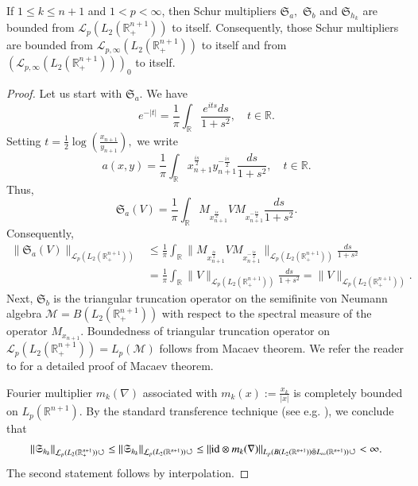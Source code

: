 \documentclass[12pt]{amsart}
\begin{document}
\begin{proposition}\label{standard schur lemma}
If $1\leq k\leq n+1$ and $1<p<\infty$, then Schur multipliers $\mathfrak{S}_a,$ $\mathfrak{S}_b$ and $\mathfrak{S}_{h_k}$ are bounded from $\mathcal{L}_p(L_2(\mathbb{R}^{n+1}_+))$ to itself. Consequently, those Schur multipliers are bounded from $\mathcal{L}_{p,\infty}(L_2(\mathbb{R}^{n+1}_+))$ to itself and from $(\mathcal{L}_{p,\infty}(L_2(\mathbb{R}^{n+1}_+)))_0$ to itself.
\end{proposition}
\begin{proof} Let us start with $\mathfrak{S}_a.$ We have
$$e^{-|t|}=\frac1{\pi}\int_{\mathbb{R}}\frac{e^{its}ds}{1+s^2},\quad t\in\mathbb{R}.$$
Setting $t=\frac{1}{2}\log(\frac{x_{n+1}}{y_{n+1}}),$ we write
$$a(x,y)=\frac1{\pi}\int_{\mathbb{R}}x_{n+1}^{\frac{is}{2}}y_{n+1}^{-\frac{is}{2}}\frac{ds}{1+s^2},\quad t\in\mathbb{R}.$$
Thus,
$$\mathfrak{S}_a(V)=\frac1{\pi}\int_{\mathbb{R}}M_{x_{n+1}^{\frac{is}{2}}}VM_{x_{n+1}^{-\frac{is}{2}}}\frac{ds}{1+s^2}.$$
Consequently,
\begin{align*}
\|\mathfrak{S}_a(V)\|_{\mathcal{L}_p(L_2(\mathbb{R}^{n+1}_+))}&\leq\frac1{\pi}\int_{\mathbb{R}}\|M_{x_{n+1}^{\frac{is}{2}}}VM_{x_{n+1}^{-\frac{is}{2}}}\|_{\mathcal{L}_p(L_2(\mathbb{R}^{n+1}_+))}\frac{ds}{1+s^2}\\
&=\frac1{\pi}\int_{\mathbb{R}}\|V\|_{\mathcal{L}_p(L_2(\mathbb{R}^{n+1}_+))}\frac{ds}{1+s^2}=\|V\|_{\mathcal{L}_p(L_2(\mathbb{R}^{n+1}_+))}.
\end{align*}
Next, $\mathfrak{S}_b$ is the triangular truncation operator on the semifinite von Neumann algebra $\mathcal{M}=B(L_2(\mathbb{R}^{n+1}_+))$ with respect to the spectral measure of the operator $M_{x_{n+1}}.$ Boundedness of triangular truncation operator on
$\mathcal{L}_p(L_2(\mathbb{R}^{n+1}_+))=L_p(\mathcal{M})$ follows from Macaev theorem. We refer the reader to \cite{MSZ-krein} for a detailed proof of Macaev theorem.

Fourier multiplier $m_k(\nabla)$ associated with $m_k(x):=\frac{x_{k}}{|x|}$ is completely bounded on $L_p(\mathbb{R}^{n+1}).$ By the standard transference technique (see e.g.  \cite{MR3378821,MR2866074}), we conclude that
\begin{align*}
\|\mathfrak{S}_{h_k}\|_{\mathcal{L}_p(L_2(\mathbb{R}_+^{n+1}))\circlearrowleft}\leq \|\mathfrak{S}_{h_k}\|_{\mathcal{L}_p(L_2(\mathbb{R}^{n+1}))\circlearrowleft}
\leq\|{\rm id}\otimes m_k(\nabla)\|_{L_p(B(L_2(\mathbb{R}^{n+1}))\bar{\otimes}L_{\infty}(\mathbb{R}^{n+1}))\circlearrowleft}<\infty.
\end{align*}
The second statement follows by interpolation.
\end{proof}
\end{document}
